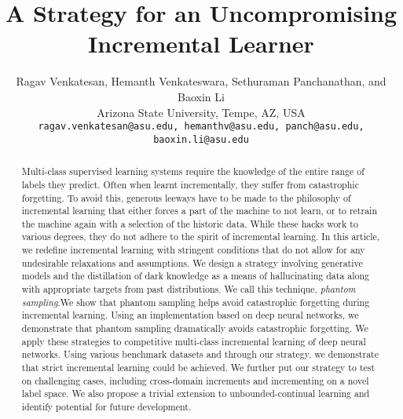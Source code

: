\documentclass[10pt,twocolumn,letterpaper]{article}
\begin{document}
	
	\title{A Strategy for an Uncompromising Incremental Learner}
	
	\author{Ragav Venkatesan, Hemanth Venkateswara, Sethuraman Panchanathan, and Baoxin Li
		\\
		Arizona State University, Tempe, AZ, USA \\
		{\tt\small ragav.venkatesan@asu.edu, hemanthv@asu.edu, panch@asu.edu, baoxin.li@asu.edu}}
	
	\maketitle
	
	
	
	
	
	\begin{abstract}
		Multi-class supervised learning systems require the knowledge of the entire range of labels they predict. Often when learnt incrementally, they suffer from catastrophic forgetting. To avoid this, generous leeways have to be made to the philosophy of incremental learning that either forces a part of the machine to not learn, or to retrain the machine again with a selection of the historic data. While these hacks work to various degrees, they do not adhere to the spirit of incremental learning. In this article, we redefine incremental learning with stringent conditions that do not allow for any undesirable relaxations and assumptions. We design a strategy involving generative models and the distillation of dark knowledge as a means of hallucinating data along with appropriate targets from past distributions. We call this technique, \emph{phantom sampling}.We show that phantom sampling helps avoid catastrophic forgetting during incremental learning. Using an implementation based on deep neural networks, we demonstrate that phantom sampling dramatically avoids catastrophic forgetting. We apply these strategies to competitive multi-class incremental learning of deep neural networks. Using various benchmark datasets and through our strategy, we demonstrate that strict incremental learning could be achieved. We further put our strategy to test on challenging cases, including cross-domain increments and incrementing on a novel label space. We also propose a trivial extension to unbounded-continual learning and identify potential for future development.
		
	\end{abstract}
	
\end{document}
